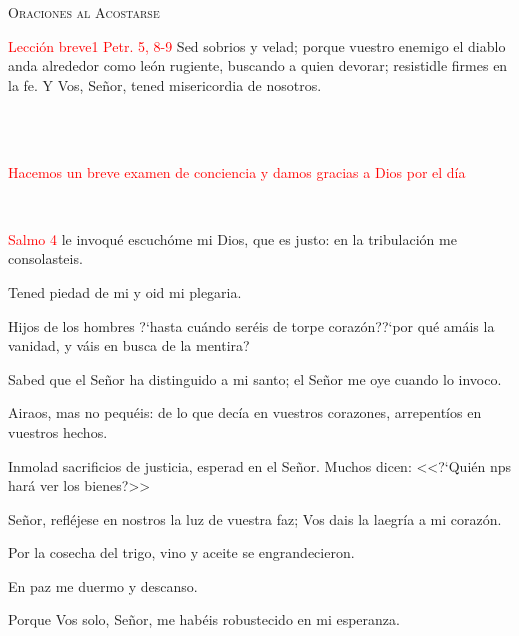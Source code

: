 \documentclass[9pt]{article}
\begin{document}
\begin{multicols}{2}
      \begin{center}
            \textsc{\Large{Oraciones al Acostarse}}
      \end{center}
      \textcolor{red}{Lección breve}\hfill\textcolor{red}{1 Petr. 5, 8-9}
      Sed sobrios y velad; porque vuestro enemigo el diablo anda alrededor como león rugiente, buscando a quien devorar; resistidle firmes en la fe.
      Y Vos, Señor, tened misericordia de nosotros.\\[1mm]
      \\[1mm]
      \begin{otherlanguage}{latin}
            \\[1mm]
      \end{otherlanguage}
      \textcolor{red}{Hacemos un breve examen de conciencia y damos gracias a Dios por el día}\\[1mm]
      \begin{otherlanguage}{latin}
            \\[1mm]
      \end{otherlanguage}
      \hfill\textcolor{red}{Salmo 4}
      le invoqué escuchóme mi Dios, que es justo: en la tribulación me consolasteis.

      Tened piedad de mi y oid mi plegaria.

      Hijos de los hombres {?`}hasta cuándo seréis de torpe corazón?{?`}por qué amáis la vanidad, y váis en busca de la mentira?

      Sabed que el Señor ha distinguido a mi santo; el Señor me oye cuando lo invoco.

      Airaos, mas no pequéis: de lo que decía en vuestros corazones, arrepentíos en vuestros hechos.
      
      Inmolad sacrificios de justicia, esperad en el Señor. Muchos dicen: <<{?`}Quién nps hará ver los bienes?>>

      Señor, refléjese en nostros la luz de vuestra faz; Vos dais la laegría a mi corazón.

      Por la cosecha del trigo, vino y aceite se engrandecieron.

      En paz me duermo y descanso.

      Porque Vos solo, Señor, me habéis robustecido en mi esperanza.


\end{multicols}
\end{document}

